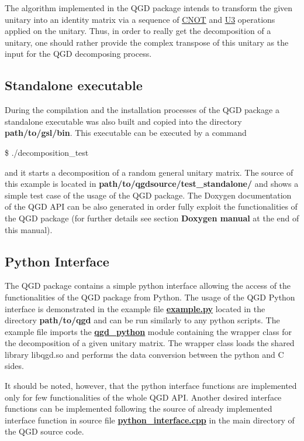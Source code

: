 The algorithm implemented in the Q\+GD package intends to transform the given unitary into an identity matrix via a sequence of \hyperlink{class_c_n_o_t}{C\+N\+OT} and \hyperlink{class_u3}{U3} operations applied on the unitary. Thus, in order to really get the decomposition of a unitary, one should rather provide the complex transpose of this unitary as the input for the Q\+GD decomposing process.

\subsection*{Standalone executable}

During the compilation and the installation processes of the Q\+GD package a standalone executable was also built and copied into the directory {\bfseries path/to/gsl/bin}. This executable can be executed by a command

\$ ./decomposition\+\_\+test

and it starts a decomposition of a random general unitary matrix. The source of this example is located in {\bfseries path/to/qgdsource/test\+\_\+standalone/} and shows a simple test case of the usage of the Q\+GD package. The Doxygen documentation of the Q\+GD A\+PI can be also generated in order fully exploit the functionalities of the Q\+GD package (for further details see section {\bfseries Doxygen manual} at the end of this manual).

\subsection*{Python Interface}

The Q\+GD package contains a simple python interface allowing the access of the functionalities of the Q\+GD package from Python. The usage of the Q\+GD Python interface is demonstrated in the example file {\bfseries \hyperlink{example_8py}{example.\+py}} located in the directory {\bfseries path/to/qgd} and can be run similarly to any python scripts. The example file imports the {\bfseries \hyperlink{namespaceqgd__python}{qgd\+\_\+python}} module containing the wrapper class for the decomposition of a given unitary matrix. The wrapper class loads the shared library libqgd.\+so and performs the data conversion between the python and C sides.

It should be noted, however, that the python interface functions are implemented only for few functionalities of the whole Q\+GD A\+PI. Another desired interface functions can be implemented following the source of already implemented interface function in source file {\bfseries \hyperlink{python__interface_8cpp}{python\+\_\+interface.\+cpp}} in the main directory of the Q\+GD source code.


